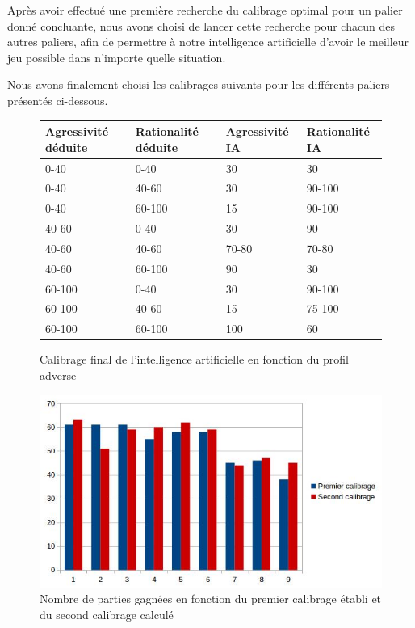 \documentclass{report}
\begin{document}
Après avoir effectué une première recherche du calibrage optimal pour un palier donné concluante, nous avons choisi de lancer cette recherche pour chacun des autres paliers, afin de permettre à notre intelligence artificielle d'avoir le meilleur jeu possible dans n'importe quelle situation.\par

Nous avons finalement choisi les calibrages suivants pour les différents paliers présentés ci-dessous.

\begin{figure}[H]
\begin{center}
\begin{tabular}{|l|l|l|l|}
\hline
Agressivité déduite &	Rationalité déduite &	Agressivité IA & 	Rationalité IA\\
\hline
0-40	 & 0-40 &	30 &	30\\
\hline
0-40 &	40-60 &	30 &	90-100\\
\hline
0-40	 & 60-100 &	15&	90-100\\
\hline
40-60 &	0-40 &	30 &	90\\
\hline
40-60 &	40-60 &	70-80 & 70-80\\
\hline
40-60 &	60-100 &	 90 &	30\\
\hline
60-100 &	 0-40 &	30 & 	90-100\\
\hline
60-100 & 	40-60 &	15 & 	75-100\\
\hline
60-100 &	 60-100 &	100 &	60\\
\hline
\end{tabular}
\end{center}
\caption{Calibrage final de l'intelligence artificielle en fonction du profil adverse}
\end{figure}


\begin{figure}[H]
	\begin{center}
		\includegraphics[scale=0.5]{./imagesRapport/NombrePartiesGagneesEnFonctionCalibrage.jpg}
	\end{center}
	\caption{Nombre de parties gagnées en fonction du premier calibrage établi et du second calibrage calculé}
\end{figure}
\end{document}
